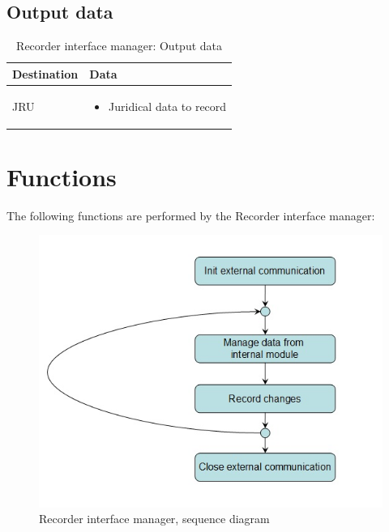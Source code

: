 \documentclass[nocc]{template/openetcs_report}
\begin{document}
\subsection{Output data}
			\begin{longtable}{|l|l|}
				\caption{Recorder interface manager: Output data}\\ 
				\hline
				
					\begin{minipage}[t]{0.35\linewidth} \textbf{Destination}	\end{minipage} 
				&	\begin{minipage}[t]{0.65\linewidth} \textbf{Data} \end{minipage} \\
				
				\hline
																																									
					\begin{minipage}[t]{0.35\linewidth} JRU	\end{minipage} 
				&	\begin{minipage}[t]{0.65\linewidth}
						\begin{itemize}
							\item Juridical data to record
						\end{itemize}
					\end{minipage} \\
				
				\hline
			\end{longtable}
\newpage				
\section{Functions}
The following functions are performed by the Recorder interface manager:
\begin{figure}[!h]
  \centering
  \includegraphics[width=\textwidth]{image/evc_recorder_interf_manager}
  \caption{Recorder interface manager, sequence diagram}
  \label{fig:Recorder interface manager, sequence diagram}
\end{figure}
\end{document}
